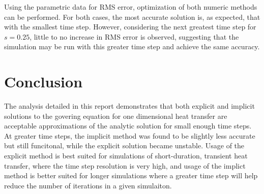 \documentclass[twocolumn,10pt]{asme2ej}
\begin{document}
Using the parametric data for RMS error, optimization of both numeric methods can be performed.  For both cases, the most accurate solution is, as expected, that with the smallest time step.  However, considering the next greatest time step for $s = 0.25$,  little to no increase in RMS error is observed, suggesting that the simulation may be run with this greater time step and achieve the same accuracy.  

\section{Conclusion}
The analysis detailed in this report demonstrates that both explicit and implicit solutions to the govering equation for one dimensional heat transfer are acceptable approximations of the analytic solution for small enough time steps.  At greater time steps, the implicit method was found to be slightly less accurate but still funcitonal, while the explicit solution became unstable.  Usage of the explicit method is best suited for simulations of short-duration, transient heat transfer, where the time step resolution is very high, and usage of the implict method is better suited for longer simulations where a greater time step will help reduce the number of iterations in a given simulaiton.


%

%

%

\end{document}
